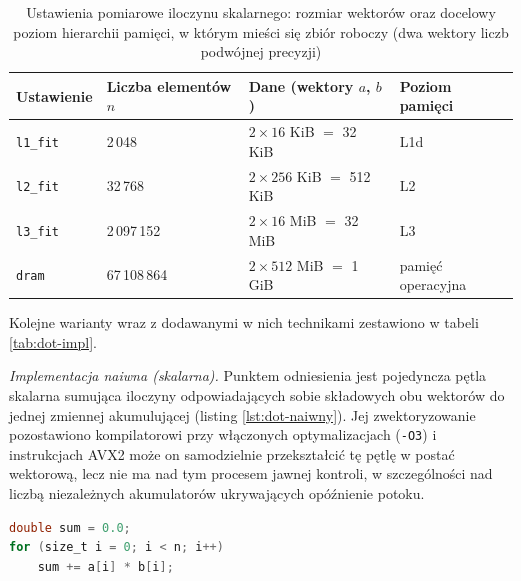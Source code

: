 \documentclass[a4paper,12pt]{book} %
\begin{document}
\begin{table}[t!]
\centering
\caption{Ustawienia pomiarowe iloczynu skalarnego: rozmiar wektorów oraz docelowy poziom hierarchii pamięci, w którym mieści się zbiór roboczy (dwa wektory liczb podwójnej precyzji)}
\label{tab:dot-presety}
\begin{tabular}{llll}
\hline
Ustawienie & Liczba elementów $n$ & Dane (wektory $a$, $b$) & Poziom pamięci \\
\hline
\texttt{l1\_fit} & 2\,048      & $2 \times 16$ KiB $=$ 32 KiB   & L1d \\
\texttt{l2\_fit} & 32\,768     & $2 \times 256$ KiB $=$ 512 KiB & L2 \\
\texttt{l3\_fit} & 2\,097\,152 & $2 \times 16$ MiB $=$ 32 MiB   & L3 \\
\texttt{dram}    & 67\,108\,864 & $2 \times 512$ MiB $=$ 1 GiB  & pamięć operacyjna \\
\hline
\end{tabular}
\end{table}

Kolejne warianty wraz z dodawanymi w nich technikami zestawiono w tabeli \ref{tab:dot-impl}.

\emph{Implementacja naiwna (skalarna).} Punktem odniesienia jest pojedyncza pętla skalarna sumująca iloczyny odpowiadających sobie składowych obu wektorów do jednej zmiennej akumulującej (listing \ref{lst:dot-naiwny}). Jej zwektoryzowanie pozostawiono kompilatorowi przy włączonych optymalizacjach (\texttt{-O3}) i instrukcjach AVX2 może on samodzielnie przekształcić tę pętlę w postać wektorową, lecz nie ma nad tym procesem jawnej kontroli, w szczególności nad liczbą niezależnych akumulatorów ukrywających opóźnienie potoku.

\begin{lstfloat}[t!]
\begin{lstlisting}[language=C, caption={Iloczyn skalarny, pętla naiwna (skalarna)}, label={lst:dot-naiwny}]
double sum = 0.0;
for (size_t i = 0; i < n; i++)
    sum += a[i] * b[i];
\end{lstlisting}
\end{lstfloat}
\end{document}
